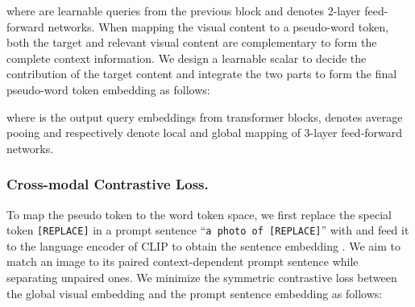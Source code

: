 \documentclass[letterpaper]{article} \usepackage{aaai24}  \usepackage{times}  \usepackage{helvet}  \usepackage{courier}  \usepackage[hyphens]{url}  \usepackage{graphicx} \urlstyle{rm} \def\UrlFont{\rm}  \usepackage{natbib}  \usepackage{caption} \frenchspacing  \setlength{\pdfpagewidth}{8.5in} \setlength{\pdfpageheight}{11in} \usepackage{algorithm}
\begin{document}
\noindent where  are learnable queries from the previous block and  denotes 2-layer feed-forward networks. When mapping the visual content to a pseudo-word token, both the target and relevant visual content are complementary to form the complete context information. We design a learnable scalar  to decide the contribution of the target content and integrate the two parts to form the final pseudo-word token embedding  as follows:  


\iffalse

\fi

\iffalse

\fi
\noindent where  is the output query embeddings from  transformer blocks,  denotes average pooing  and  respectively denote local and global mapping of 3-layer feed-forward networks. 


\subsubsection{Cross-modal Contrastive Loss.} 
To map the pseudo token  to the word token space,  we first replace the special token \texttt{[REPLACE]} in a prompt sentence ``\texttt{a photo of [REPLACE]}'' with  and feed it to the language encoder of CLIP to obtain the sentence embedding . We aim to match an image to its paired context-dependent prompt sentence while separating unpaired
ones. We minimize the symmetric contrastive loss between the global visual embedding  and the prompt sentence embedding  as follows:
\end{document}
